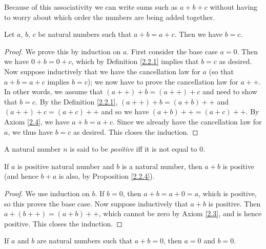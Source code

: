 \begin{note}
Because of this associativity we can write sums such as \(a + b + c\) without having to worry about which order the numbers are being added together.
\end{note}

\begin{proposition}\label{2.2.6}
Let \(a\), \(b\), \(c\) be natural numbers such that \(a + b = a + c\).
Then we have \(b = c\).
\end{proposition}

\begin{proof}
We prove this by induction on \(a\).
First consider the base case \(a = 0\).
Then we have \(0 + b = 0 + c\), which by Definition \ref{2.2.1} implies that \(b = c\) as desired.
Now suppose inductively that we have the cancellation law for \(a\) (so that \(a + b = a + c\) implies \(b = c\));
we now have to prove the cancellation law for \(a++\).
In other words, we assume that \((a++) + b = (a++) + c\) and need to show that \(b = c\).
By the Definition \ref{2.2.1}, \((a++) + b = (a + b)++\) and \((a++) + c = (a + c)++\) and so we have \((a + b)++ = (a + c)++\).
By Axiom \ref{2.4}, we have \(a + b = a + c\).
Since we already have the cancellation law for \(a\), we thus have \(b = c\) as desired.
This closes the induction.
\end{proof}

\begin{definition}\label{2.2.7}
A natural number \(n\) is said to be \emph{positive} iff it is not equal to \(0\).
\end{definition}

\begin{proposition}\label{2.2.8}
If \(a\) is positive natural number and \(b\) is a natural number, then \(a + b\) is positive (and hence \(b + a\) is also, by Proposition \ref{2.2.4}).
\end{proposition}

\begin{proof}
We use induction on \(b\).
If \(b = 0\), then \(a + b = a + 0 = a\), which is positive, so this proves the base case.
Now suppose inductively that \(a + b\) is positive.
Then \(a + (b++) = (a + b)++\), which cannot be zero by Axiom \ref{2.3}, and is hence positive.
This closes the induction.
\end{proof}

\begin{corollary}\label{2.2.9}
If \(a\) and \(b\) are natural numbers such that \(a + b = 0\), then \(a = 0\) and \(b = 0\).
\end{corollary}

